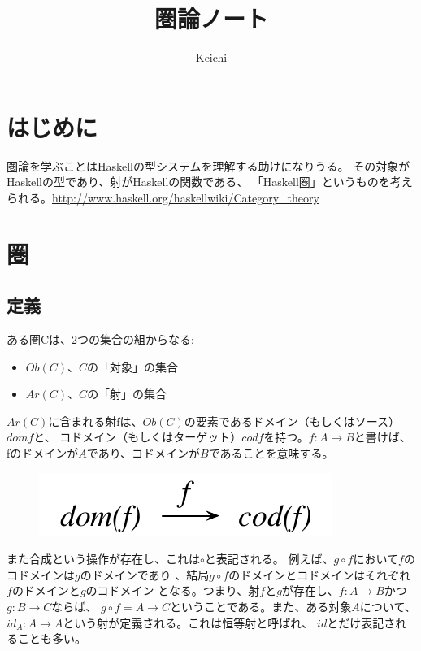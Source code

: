 \documentclass{jsarticle}
\begin{document}
\title{圏論ノート}
\author{Keichi}
\maketitle

\section{はじめに}
圏論を学ぶことはHaskellの型システムを理解する助けになりうる。
その対象がHaskellの型であり、射がHaskellの関数である、
「Haskell圏」というものを考えられる。\url{http://www.haskell.org/haskellwiki/Category_theory}

\section{圏}

\subsection{定義}
ある圏Cは、2つの集合の組からなる:

\begin{itemize}
    \item $Ob(C)$、$C$の「対象」の集合
    \item $Ar(C)$、$C$の「射」の集合
\end{itemize}

$Ar(C)$に含まれる射fは、$Ob(C)$の要素であるドメイン（もしくはソース）$dom f$と、
コドメイン（もしくはターゲット）$cod f$を持つ。$f:A \to B$と書けば、
fのドメインが$A$であり、コドメインが$B$であることを意味する。

\begin{figure}[htbp]
    \centering
    \includegraphics{diag_dom.pdf} 
\end{figure}

また合成という操作が存在し、これは$\circ$と表記される。
例えば、$g \circ f$において$f$のコドメインは$g$のドメインであり
、結局$g \circ f$のドメインとコドメインはそれぞれ$f$のドメインと$g$のコドメイン
となる。つまり、射$f$と$g$が存在し、$f:A \to B$かつ$g:B \to C$ならば、
$g \circ f = A \to C$ということである。また、ある対象$A$について、
$id_A: A \to A$という射が定義される。これは恒等射と呼ばれ、
$id$とだけ表記されることも多い。
\end{document}
